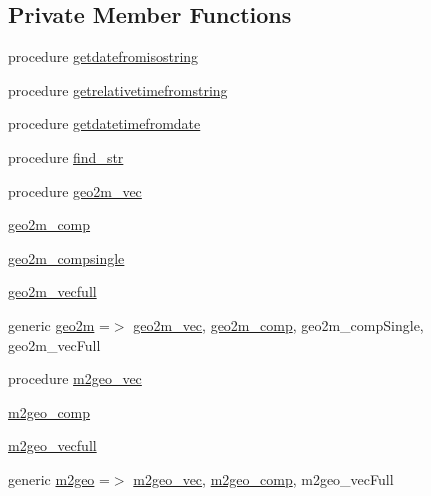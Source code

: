 \subsection*{Private Member Functions}
\begin{DoxyCompactItemize}
\item 
procedure \mbox{\hyperlink{structutilities__mod_1_1utils__class_af2c6e40cca9f6f643105eef0c16f09aa}{getdatefromisostring}}
\item 
procedure \mbox{\hyperlink{structutilities__mod_1_1utils__class_a7c6279ee9c593690a6f82a97be3a4699}{getrelativetimefromstring}}
\item 
procedure \mbox{\hyperlink{structutilities__mod_1_1utils__class_a914797ca760fbe6a8ed5706497fa6534}{getdatetimefromdate}}
\item 
procedure \mbox{\hyperlink{structutilities__mod_1_1utils__class_a70fcd702c2e81aaf574c3e031b7b0fef}{find\+\_\+str}}
\item 
procedure \mbox{\hyperlink{structutilities__mod_1_1utils__class_a37ba4d9fc1c6ef99561627f05c82cf7e}{geo2m\+\_\+vec}}
\item 
\mbox{\hyperlink{structutilities__mod_1_1utils__class_ab41bb5a8810e938810f0d08c42c312c9}{geo2m\+\_\+comp}}
\item 
\mbox{\hyperlink{structutilities__mod_1_1utils__class_a755739bd32b296aa93890ced6fe1f039}{geo2m\+\_\+compsingle}}
\item 
\mbox{\hyperlink{structutilities__mod_1_1utils__class_a127b95b7b59811e93f88796c5dc6f6ce}{geo2m\+\_\+vecfull}}
\item 
generic \mbox{\hyperlink{structutilities__mod_1_1utils__class_a4a47223016b4e4c87167eddf37f8bcee}{geo2m}} =$>$ \mbox{\hyperlink{structutilities__mod_1_1utils__class_a37ba4d9fc1c6ef99561627f05c82cf7e}{geo2m\+\_\+vec}}, \mbox{\hyperlink{structutilities__mod_1_1utils__class_ab41bb5a8810e938810f0d08c42c312c9}{geo2m\+\_\+comp}}, geo2m\+\_\+comp\+Single, geo2m\+\_\+vec\+Full
\item 
procedure \mbox{\hyperlink{structutilities__mod_1_1utils__class_a8319bf9d14dd225be0f30f5e0c1f04e3}{m2geo\+\_\+vec}}
\item 
\mbox{\hyperlink{structutilities__mod_1_1utils__class_a8cceeee65240f821428cd4dc65fd5fa0}{m2geo\+\_\+comp}}
\item 
\mbox{\hyperlink{structutilities__mod_1_1utils__class_a014536e96c18d67b0d8038c22d2d624a}{m2geo\+\_\+vecfull}}
\item 
generic \mbox{\hyperlink{structutilities__mod_1_1utils__class_a56c02806fb02449b066f44e73784c835}{m2geo}} =$>$ \mbox{\hyperlink{structutilities__mod_1_1utils__class_a8319bf9d14dd225be0f30f5e0c1f04e3}{m2geo\+\_\+vec}}, \mbox{\hyperlink{structutilities__mod_1_1utils__class_a8cceeee65240f821428cd4dc65fd5fa0}{m2geo\+\_\+comp}}, m2geo\+\_\+vec\+Full

\end{DoxyCompactItemize}
